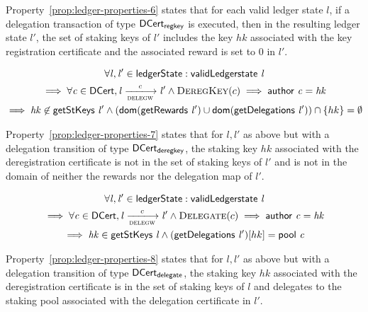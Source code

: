 Property~\ref{prop:ledger-properties-6} states that for each valid ledger state
$l$, if a delegation transaction of type $\mathsf{DCert_{regkey}}$ is executed, then in the
resulting ledger state $l'$, the set of staking keys of $l'$ includes the key
$hk$ associated with the key registration certificate and the associated reward
is set to 0 in $l'$.

\begin{property}
  \begin{multline*}
    \forall \var{l}, \var{l'} \in \ledgerState: \applyFun{validLedgerstate}{l}\\
    \implies \forall \var{c} \in \DCert, \var{l} \trans{delegw}{c} \var{l'}
    \wedge \DeregKey{c} \implies \applyFun{author}{c} = \var{hk}\\ \implies
    \var{hk} \not\in \applyFun{getStKeys}{l'} \wedge
    (\fun{dom}(\applyFun{getRewards}{l'}) \cup
    \fun{dom}(\applyFun{getDelegations}{l'})) \cap \{hk\} = \emptyset
  \end{multline*}
  \label{prop:ledger-properties-7}
\end{property}

Property~\ref{prop:ledger-properties-7} states that for $l, l'$ as above but
with a delegation transition of type $\mathsf{DCert_{deregkey}}$, the staking key $hk$
associated with the deregistration certificate is not in the set of staking keys
of $l'$ and is not in the domain of neither the rewards nor the delegation map
of $l'$.

\begin{property}
  \begin{multline*}
    \forall \var{l}, \var{l'} \in \ledgerState: \applyFun{validLedgerstate}{l}\\
    \implies \forall \var{c} \in \DCert, \var{l} \trans{delegw}{c} \var{l'}
    \wedge \Delegate{c} \implies \applyFun{author}{c} = \var{hk}\\ \implies
    \var{hk} \in \applyFun{getStKeys}{l} \wedge
    (\applyFun{getDelegations}{l'})[hk] = \applyFun{pool}{c}
  \end{multline*}
  \label{prop:ledger-properties-8}
\end{property}

Property~\ref{prop:ledger-properties-8} states that for $l, l'$ as above but
with a delegation transition of type $\mathsf{DCert_{delegate}}$, the staking key $hk$
associated with the deregistration certificate is in the set of staking keys of
$l$ and delegates to the staking pool associated with the delegation
certificate in $l'$.

